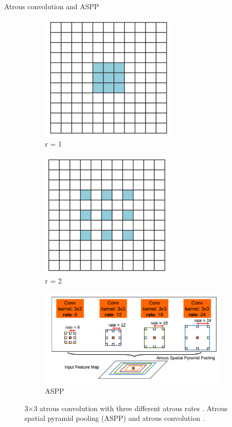 \documentclass{beamer}
\begin{document}
\begin{frame}{Atrous convolution and ASPP}
	\begin{figure}
		\centering
		\begin{subfigure}{.23\textwidth}
			\centering
			\includegraphics[width=0.5\linewidth]{images/r_1}
			\caption{r = 1}
		\end{subfigure}
		\begin{subfigure}{.23\textwidth}
			\centering
			\includegraphics[width=0.5\linewidth]{images/r_2}
			\caption{r = 2}
		\end{subfigure}
		\begin{subfigure}{.5\textwidth}
			\centering
			\includegraphics[width=1\linewidth]{images/aspp}
			\caption{ASPP}
		\end{subfigure}
		\caption{3$\times$3 atrous convolution with three different atrous rates \cite{DBLP:journals/corr/Garcia-GarciaOO17}. Atrous spatial pyramid pooling (ASPP) and atrous convolution \cite{DBLP:journals/corr/ChenPK0Y16}.}
		\label{Fig:atconv}
	\end{figure}

\end{frame}
\end{document}
